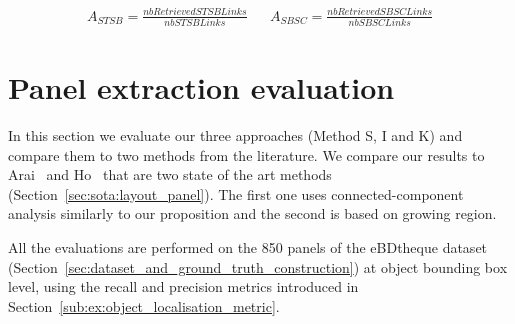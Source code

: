 \begin{align}
\label{eq:ex:accuracy_semantic_links}
A_{STSB} = \frac{nbRetrievedSTSBLinks}{nbSTSBLinks} && A_{SBSC} = \frac{nbRetrievedSBSCLinks}{nbSBSCLinks}
\end{align}








\section{Panel extraction evaluation} %
\label{sub:ex:panel_extraction_evaluation}

In this section we evaluate our three approaches (Method S, I and K) and compare them to two methods from the literature.
We compare our results to Arai~\cite{Arai10} and Ho~\cite{Ho2012} that are two state of the art methods (Section~\ref{sec:sota:layout_panel}).
The first one uses connected-component analysis similarly to our proposition and the second is based on growing region.

All the evaluations are performed on the 850 panels of the eBDtheque dataset (Section~\ref{sec:dataset_and_ground_truth_construction}) at object bounding box level, using the recall and precision metrics introduced in Section~\ref{sub:ex:object_localisation_metric}.

